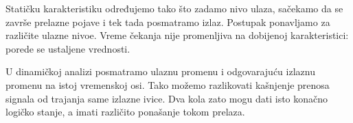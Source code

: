 Statičku karakteristiku određujemo tako što zadamo nivo ulaza, sačekamo da se završe prelazne pojave i tek tada posmatramo izlaz. Postupak ponavljamo za različite ulazne nivoe. Vreme čekanja nije promenljiva na dobijenoj karakteristici: porede se ustaljene vrednosti.

U dinamičkoj analizi posmatramo ulaznu promenu i odgovarajuću izlaznu promenu na istoj vremenskoj osi. Tako možemo razlikovati kašnjenje prenosa signala od trajanja same izlazne ivice. Dva kola zato mogu dati isto konačno logičko stanje, a imati različito ponašanje tokom prelaza.
